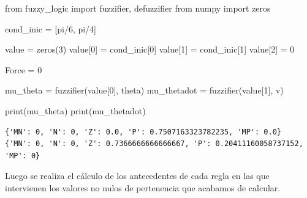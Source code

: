 \documentclass[onecolumn]{article}
\newenvironment{Shaded}{}{}
\newcommand{\BuiltInTok}[1]{#1}
\newcommand{\DecValTok}[1]{\textcolor[rgb]{0.25,0.63,0.44}{#1}}
\newcommand{\ImportTok}[1]{#1}
\newcommand{\NormalTok}[1]{#1}
\newcommand{\OperatorTok}[1]{\textcolor[rgb]{0.40,0.40,0.40}{#1}}
\begin{document}
\begin{Shaded}
\begin{Highlighting}[]
\ImportTok{from}\NormalTok{ fuzzy_logic }\ImportTok{import}\NormalTok{ fuzzifier, defuzzifier}
\ImportTok{from}\NormalTok{ numpy }\ImportTok{import}\NormalTok{ zeros}

\NormalTok{cond_inic }\OperatorTok{=}\NormalTok{ [pi}\OperatorTok{/}\DecValTok{6}\NormalTok{, pi}\OperatorTok{/}\DecValTok{4}\NormalTok{]}

\NormalTok{value }\OperatorTok{=}\NormalTok{ zeros(}\DecValTok{3}\NormalTok{)}
\NormalTok{value[}\DecValTok{0}\NormalTok{] }\OperatorTok{=}\NormalTok{ cond_inic[}\DecValTok{0}\NormalTok{]}
\NormalTok{value[}\DecValTok{1}\NormalTok{] }\OperatorTok{=}\NormalTok{ cond_inic[}\DecValTok{1}\NormalTok{]}
\NormalTok{value[}\DecValTok{2}\NormalTok{] }\OperatorTok{=} \DecValTok{0}

\NormalTok{Force }\OperatorTok{=} \DecValTok{0}

\NormalTok{mu_theta }\OperatorTok{=}\NormalTok{ fuzzifier(value[}\DecValTok{0}\NormalTok{], theta)}
\NormalTok{mu_thetadot }\OperatorTok{=}\NormalTok{ fuzzifier(value[}\DecValTok{1}\NormalTok{], v)}

\BuiltInTok{print}\NormalTok{(mu_theta)}
\BuiltInTok{print}\NormalTok{(mu_thetadot)}
\end{Highlighting}
\end{Shaded}

\begin{verbatim}
{'MN': 0, 'N': 0, 'Z': 0.0, 'P': 0.7507163323782235, 'MP': 0.0}
{'MN': 0, 'N': 0, 'Z': 0.7366666666666667, 'P': 0.20411160058737152, 'MP': 0}
\end{verbatim}

Luego se realiza el cálculo de los antecedentes de cada regla en las que
intervienen los valores no nulos de pertenencia que acabamos de
calcular.
\end{document}
